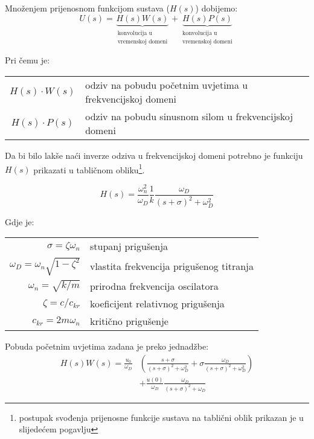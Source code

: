 Množenjem prijenosnom funkcijom sustava ($H(s)$) dobijemo:
\begin{equation}
	U(s)=\underbrace{H(s)W(s)}_{\substack{\text{konvolucija u}\\\text{vremenskoj
	domeni}}}
	+ 
	\underbrace{H(s)P(s)}_{\substack{\text{konvolucija u}\\\text{vremenskoj domeni}}}
\end{equation}

Pri čemu je:
\begin{table}[H]
\begin{tabular}{c l}
	$H(s)\cdot W(s)$ & odziv na pobudu početnim uvjetima u frekvencijskoj domeni\\
	$H(s)\cdot P(s)$ & odziv na pobudu sinusnom silom u frekvencijskoj domeni\\
\end{tabular}
\end{table}

Da bi bilo lakše naći inverze odziva u frekvencijskoj domeni potrebno je funkciju  
$H(s)$ prikazati u tabličnom obliku\footnote{postupak svođenja prijenosne funkcije
sustava na tablični oblik prikazan je u slijedećem pogavlju}.

\begin{equation}\label{eq:pfs_tablicni_oblik}
    H(s) = \frac{\omega_n^2}{\omega_D}
           \frac{1}{k}
           \frac{\omega_D}{(s+\sigma)^2+\omega_D^2}
\end{equation}

Gdje je:\\
\begin{table}[H]
    \begin{tabular}{r l}
        $\sigma=\zeta\omega_n$ & stupanj prigušenja\\
        $\omega_D=\omega_n\sqrt{1-\zeta^2}$ & vlastita frekvencija prigušenog titranja\\
        $\omega_n=\sqrt{k/m}$ & prirodna frekvencija oscilatora\\
        $\zeta=c/c_{kr}$ & koeficijent relativnog prigušenja\\
        $c_{kr}=2m\omega_n$ & kritično prigušenje
    \end{tabular}
\end{table}

Pobuda početnim uvjetima zadana je preko jednadžbe:
\begin{equation}
    \begin{split}
        H(s)W(s)=\frac{u_0}{\omega_D}&\left(
        \frac{s+\sigma}{(s+\sigma)^2+\omega_D^2} +
	\sigma\frac{\omega_D}{(s+\sigma)^2+\omega_D^2}\right)\\
        &+ \frac{\dot{u}(0)}{\omega_D}\frac{\omega_D}{(s+\sigma)^2+\omega_D}
    \end{split}
\end{equation}

